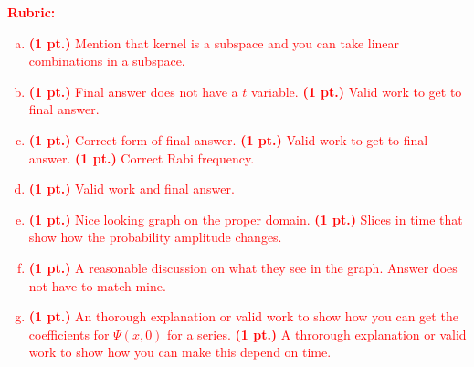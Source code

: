 \documentclass[12pt]{article} %
\begin{document}
\vspace*{1cm}
\textcolor{red}{
\noindent \textbf{Rubric:}
\begin{enumerate}[(a)]
    \item \textbf{(1 pt.)} Mention that kernel is a subspace and you can take linear combinations in a subspace.
    \item \textbf{(1 pt.)} Final answer does not have a $t$ variable. \textbf{(1 pt.)} Valid work to get to final answer.
    \item \textbf{(1 pt.)} Correct form of final answer. \textbf{(1 pt.)} Valid work to get to final answer. \textbf{(1 pt.)} Correct Rabi frequency.
	\item \textbf{(1 pt.)} Valid work and final answer. 
	\item \textbf{(1 pt.)} Nice looking graph on the proper domain. \textbf{(1 pt.)} Slices in time that show how the probability amplitude changes.
	\item \textbf{(1 pt.)} A reasonable discussion on what they see in the graph. Answer does not have to match mine.
	\item \textbf{(1 pt.)} An thorough explanation or valid work to show how you can get the coefficients for $\Psi(x,0)$ for a series. \textbf{(1 pt.)} A throrough explanation or valid work to show how you can make this depend on time.
\end{enumerate}
}
\end{document}
